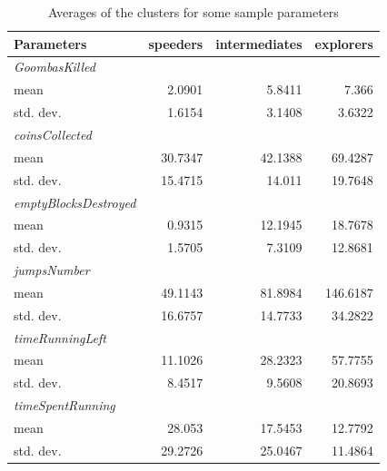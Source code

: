 \documentclass[conference]{IEEEtran}
\begin{document}
\begin{table}
\begin{center}
\renewcommand{\arraystretch}{1.3}
\caption{Averages of the clusters for some sample parameters }
\label{averages}
\begin{tabular}{|l|r|r|r|}
\hline

\textbf{Parameters} & \textbf{speeders} & \textbf{intermediates} & \textbf{explorers} \\

\hline

\textit{GoombasKilled} & & & \\
  mean &                              2.0901   & 5.8411   &  7.366 \\
  std. dev. &                          1.6154  &  3.1408   & 3.6322 \\

\hline

\textit{coinsCollected} & & & \\
  mean   &                            30.7347  & 42.1388  & 69.4287 \\
  std. dev.  &                        15.4715  &  14.011  & 19.7648 \\

\hline

\textit{emptyBlocksDestroyed} & & & \\
  mean        &                        0.9315  & 12.1945  & 18.7678 \\
  std. dev.    &                       1.5705  &  7.3109  & 12.8681 \\

\hline

\textit{jumpsNumber} & & & \\
  mean             &                  49.1143  & 81.8984  & 146.6187 \\
  std. dev.        &                  16.6757  & 14.7733  & 34.2822 \\

\hline

\textit{timeRunningLeft} & & & \\
  mean              &                 11.1026  & 28.2323  & 57.7755 \\
  std. dev.         &                  8.4517   & 9.5608  & 20.8693 \\

\hline

\textit{timeSpentRunning} & & & \\
  mean                      &          28.053  & 17.5453  & 12.7792 \\
  std. dev.             &             29.2726  & 25.0467  & 11.4864 \\


\end{tabular}
\end{center}
\end{table}
\end{document}
